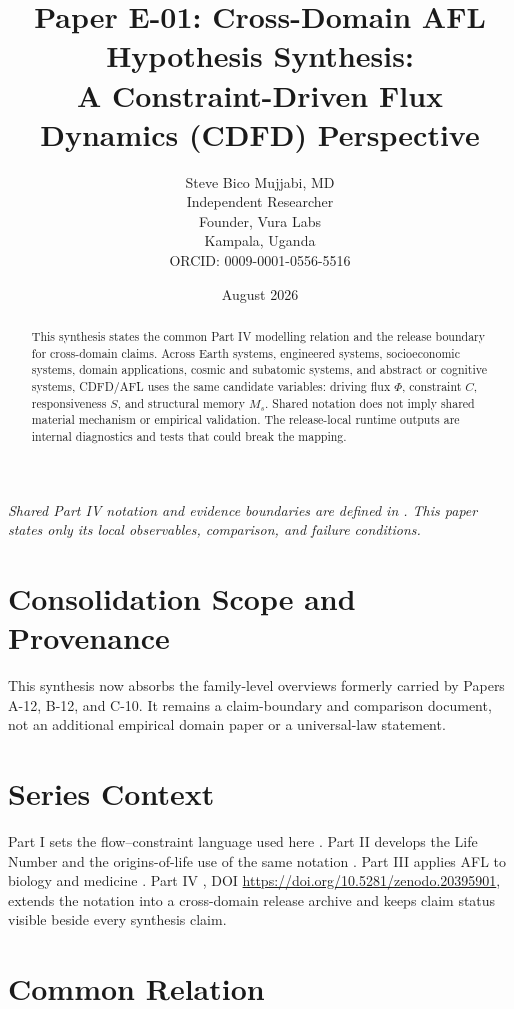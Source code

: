 \documentclass[12pt,a4paper]{article}
\title{\textbf{Paper E-01: Cross-Domain AFL Hypothesis Synthesis:\\ A Constraint-Driven Flux Dynamics (CDFD) Perspective}}
\author{Steve Bico Mujjabi, MD\\
\small Independent Researcher\\
\small Founder, Vura Labs\\
\small Kampala, Uganda\\
\small ORCID: 0009-0001-0556-5516}
\date{August 2026}
\begin{document}
\maketitle

\noindent\textit{Shared Part IV notation and evidence boundaries are defined in . This paper states only its local observables, comparison, and failure conditions.}

\begin{abstract}
This synthesis states the common Part IV modelling relation and the release
boundary for cross-domain claims. Across Earth systems, engineered systems,
socioeconomic systems, domain applications, cosmic and subatomic systems, and
abstract or cognitive systems, CDFD/AFL uses the same candidate variables:
driving flux $\Phi$, constraint $C$, responsiveness $S$, and structural memory
$M_s$. Shared notation does not imply shared material mechanism or empirical
validation. The release-local runtime outputs are internal diagnostics and
tests that could break the mapping.
\end{abstract}
\section*{Consolidation Scope and Provenance}
This synthesis now absorbs the family-level overviews formerly carried by Papers A-12, B-12, and C-10. It remains a claim-boundary and comparison document, not an additional empirical domain paper or a universal-law statement.


\section{Series Context}

Part I sets the flow--constraint language used here \cite{MujjabiPartI2026}.
Part II develops the Life Number and the origins-of-life use of the same notation
\cite{MujjabiPartII2026}. Part III applies AFL to biology and medicine
\cite{MujjabiPartIII2026}. Part IV \cite{MujjabiPartIV2026}, DOI \url{https://doi.org/10.5281/zenodo.20395901}, extends the notation into a cross-domain
release archive and keeps claim status visible beside every synthesis claim.

\section{Common Relation}
\end{document}
